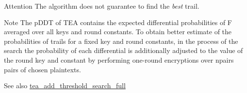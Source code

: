 \begin{DoxyAttention}{\-Attention}
\-The algorithm does not guarantee to find the {\itshape best\/} trail.
\end{DoxyAttention}
\begin{DoxyNote}{\-Note}
\-The p\-D\-D\-T of \-T\-E\-A contains the expected differential probabilities of \-F averaged over all keys and round constants. \-To obtain better estimate of the probabilities of trails for a fixed key and round constants, in the process of the search the probability of each differential is additionally adjusted to the value of the round key and constant by performing one-\/round encryptions over {\ttfamily npairs} pairs of chosen plaintexts.
\end{DoxyNote}
\begin{DoxySeeAlso}{\-See also}
\hyperlink{tea-add-threshold-search_8cc_a760f25356b1203a35c8ece3f4e8a038c}{tea\-\_\-add\-\_\-threshold\-\_\-search\-\_\-full} 
\end{DoxySeeAlso}
